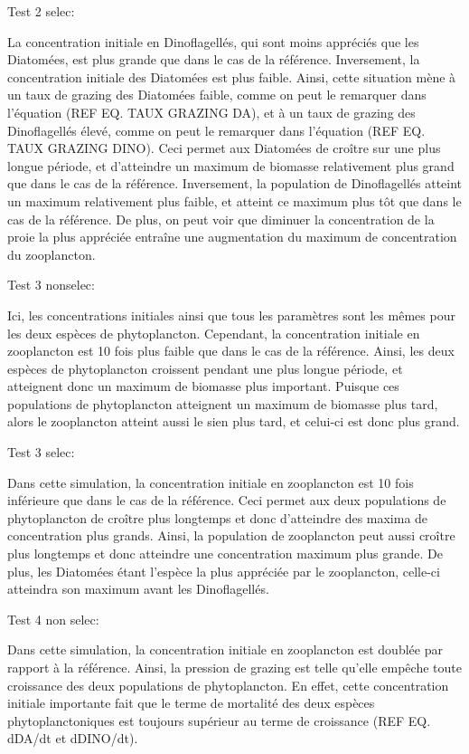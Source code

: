 Test 2 selec:

La concentration initiale en Dinoflagellés, qui sont moins appréciés que les Diatomées, est plus grande que dans le cas de la référence. Inversement, la concentration initiale des Diatomées est plus faible. Ainsi, cette situation mène à un taux de grazing des Diatomées faible, comme on peut le remarquer dans l'équation (REF EQ. TAUX GRAZING DA), et à un taux de grazing des Dinoflagellés élevé, comme on peut le remarquer dans l'équation (REF EQ. TAUX GRAZING DINO). Ceci permet aux Diatomées de croître sur une plus longue période, et d'atteindre un maximum de biomasse relativement plus grand que dans le cas de la référence. Inversement, la population de Dinoflagellés atteint un maximum relativement plus faible, et atteint ce maximum plus tôt que dans le cas de la référence. De plus, on peut voir que diminuer la concentration de la proie la plus appréciée entraîne une augmentation du maximum de concentration du zooplancton.

Test 3 nonselec:

Ici, les concentrations initiales ainsi que tous les paramètres sont les mêmes pour les deux espèces de phytoplancton. Cependant, la concentration initiale en zooplancton est 10 fois plus faible que dans le cas de la référence. Ainsi, les deux espèces de phytoplancton croissent pendant une plus longue période, et atteignent donc un maximum de biomasse plus important. Puisque ces populations de phytoplancton atteignent un maximum de biomasse plus tard, alors le zooplancton atteint aussi le sien plus tard, et celui-ci est donc plus grand. 

Test 3 selec:

Dans cette simulation, la concentration initiale en zooplancton est 10 fois inférieure que dans le cas de la référence. Ceci permet aux deux populations de phytoplancton de croître plus longtemps et donc d'atteindre des maxima de concentration plus grands. Ainsi, la population de zooplancton peut aussi croître plus longtemps et donc atteindre une concentration maximum plus grande. De plus, les Diatomées étant l'espèce la plus appréciée par le zooplancton, celle-ci atteindra son maximum avant les Dinoflagellés.

Test 4 non selec:

Dans cette simulation, la concentration initiale en zooplancton est doublée par rapport à la référence. Ainsi, la pression de grazing est telle qu'elle empêche toute croissance des deux populations de phytoplancton. En effet, cette concentration initiale importante fait que le terme de mortalité des deux espèces phytoplanctoniques est toujours supérieur au terme de croissance (REF EQ. dDA/dt et dDINO/dt).


